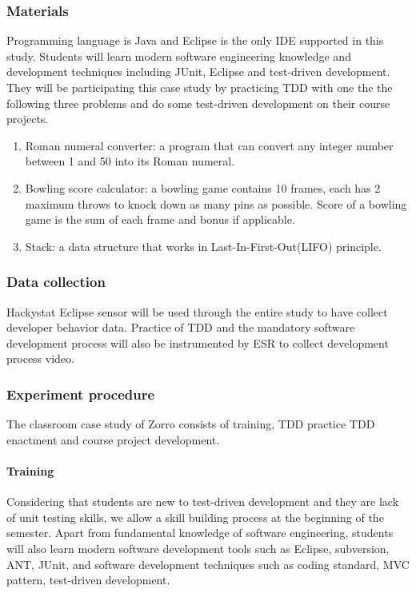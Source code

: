 \subsubsection{Materials}
Programming language is Java and Eclipse is the only IDE supported in this
study. Students will learn modern software engineering knowledge and
development techniques including JUnit, Eclipse and test-driven
development. They will be participating this case study by practicing TDD
with one the the following three problems and do some test-driven
development on their course projects.
\begin{enumerate}
\item{Roman numeral converter: a program that can convert any integer
    number between 1 and 50 into its Roman numeral.}
\item{Bowling score calculator: a bowling game contains 10 frames, each has
    2 maximum throws to knock down as many pins as possible. Score of a
    bowling game is the sum of each frame and bonus if applicable.}
\item{Stack: a data structure that works in Last-In-First-Out(LIFO)
    principle.}
\end{enumerate}

\subsubsection{Data collection}
Hackystat Eclipse sensor will be used through the entire study to have
collect developer behavior data. Practice of TDD and the mandatory software
development process will also be instrumented by ESR to collect development
process video.

\subsubsection{Experiment procedure}
The classroom case study of Zorro consists of training, TDD practice TDD
enactment and course project development.

\paragraph{Training}
Considering that students are new to test-driven development and they are
lack of unit testing skills, we allow a skill building process at the
beginning of the semester. Apart from fundamental knowledge of software
engineering, students will also learn modern software development tools
such as Eclipse, subversion, ANT, JUnit, and software development
techniques such as coding standard, MVC pattern, test-driven development.


